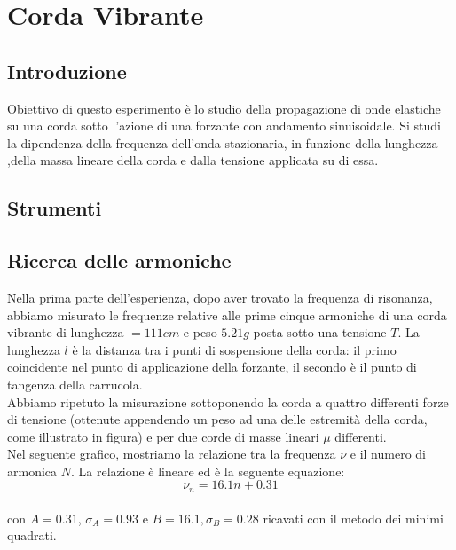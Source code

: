 

\chapter{Corda Vibrante}

\section{Introduzione}

Obiettivo di questo esperimento è lo studio della propagazione di onde elastiche su una corda sotto l'azione di una forzante con andamento sinuisoidale. Si studi la dipendenza della frequenza dell'onda stazionaria, in funzione della lunghezza ,della massa lineare della corda e dalla tensione applicata su di essa. 
\section{Strumenti}

\section{Ricerca delle armoniche}

Nella prima parte dell'esperienza, dopo aver trovato la frequenza di risonanza, abbiamo misurato le frequenze relative alle prime cinque armoniche di una corda vibrante di lunghezza $=111 cm$ e peso $5.21 g$ posta sotto una tensione $T$. La lunghezza $l$ è la distanza tra i punti di sospensione della corda: il primo coincidente nel punto di applicazione della forzante, il secondo è il punto di tangenza della carrucola.  
\\

Abbiamo ripetuto la misurazione sottoponendo la corda a quattro differenti forze di tensione (ottenute appendendo un peso ad una delle estremità della corda, come illustrato in figura) e per due corde di masse lineari $\mu$ differenti. 
\\
Nel seguente grafico, mostriamo la relazione tra la frequenza $\nu$ e il numero di armonica $N$. La relazione è lineare ed è la seguente equazione:
$$ \nu_n = 16.1n + 0.31 $$ 
\\
con $A= 0.31$, $\sigma_A=  0.93$ e $B=16.1, \sigma_B = 0.28 $ ricavati con il metodo dei minimi quadrati. 


